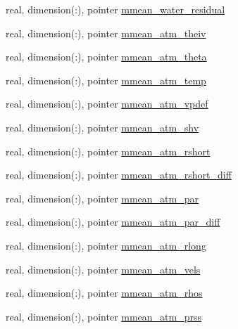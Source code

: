 \begin{DoxyCompactItemize}
\item 
real, dimension(\+:), pointer \hyperlink{structed__state__vars_1_1edtype_a8dbc45abd1735331b05ac46961deee16}{mmean\+\_\+water\+\_\+residual}
\item 
real, dimension(\+:), pointer \hyperlink{structed__state__vars_1_1edtype_a26b5ae2aba9a02cdbdd02382dad3c37b}{mmean\+\_\+atm\+\_\+theiv}
\item 
real, dimension(\+:), pointer \hyperlink{structed__state__vars_1_1edtype_a7a14b9021460c6fcdf497e7f8ef4d8f1}{mmean\+\_\+atm\+\_\+theta}
\item 
real, dimension(\+:), pointer \hyperlink{structed__state__vars_1_1edtype_a8a083a8febc3dec26c8ee4277411c920}{mmean\+\_\+atm\+\_\+temp}
\item 
real, dimension(\+:), pointer \hyperlink{structed__state__vars_1_1edtype_ab780183f60c9096e79f84296f3a38a9f}{mmean\+\_\+atm\+\_\+vpdef}
\item 
real, dimension(\+:), pointer \hyperlink{structed__state__vars_1_1edtype_ac246d8b7a0ad086ab3a04f4040383fe2}{mmean\+\_\+atm\+\_\+shv}
\item 
real, dimension(\+:), pointer \hyperlink{structed__state__vars_1_1edtype_ae452c2f203de81e36cb93de7ac2ccc42}{mmean\+\_\+atm\+\_\+rshort}
\item 
real, dimension(\+:), pointer \hyperlink{structed__state__vars_1_1edtype_a0c631e5b9a2482d817d597834dcb6226}{mmean\+\_\+atm\+\_\+rshort\+\_\+diff}
\item 
real, dimension(\+:), pointer \hyperlink{structed__state__vars_1_1edtype_a4aae3a0a74a74082bb4009cc47794d66}{mmean\+\_\+atm\+\_\+par}
\item 
real, dimension(\+:), pointer \hyperlink{structed__state__vars_1_1edtype_a7267120166dfc9e070efecddce549af5}{mmean\+\_\+atm\+\_\+par\+\_\+diff}
\item 
real, dimension(\+:), pointer \hyperlink{structed__state__vars_1_1edtype_a9501f6f77f6f4b8cb8605991b1cbcb89}{mmean\+\_\+atm\+\_\+rlong}
\item 
real, dimension(\+:), pointer \hyperlink{structed__state__vars_1_1edtype_a61c6e350246176ca8ed2f7e9e29f9599}{mmean\+\_\+atm\+\_\+vels}
\item 
real, dimension(\+:), pointer \hyperlink{structed__state__vars_1_1edtype_aaded9bba7cd9dca67bf76207b10ea4cd}{mmean\+\_\+atm\+\_\+rhos}
\item 
real, dimension(\+:), pointer \hyperlink{structed__state__vars_1_1edtype_af1b867a7480442940bae3b34dfaa8b65}{mmean\+\_\+atm\+\_\+prss}
\item 

\end{DoxyCompactItemize}
